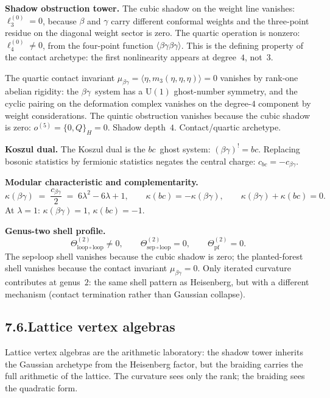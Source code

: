 \documentclass[11pt]{report}
\theoremstyle{definition}
\theoremstyle{remark}
\numberwithin{equation}{section}
\begin{document}
\medskip
\noindent\textbf{Shadow obstruction tower.}
The cubic shadow on the weight line vanishes: $\ell_3^{(0)}=0$,
because $\beta$ and $\gamma$ carry different conformal weights and the
three-point residue on the diagonal weight sector is zero. The
quartic operation is nonzero: $\ell_4^{(0)}\neq 0$, from the
four-point function
$\langle\beta\gamma\beta\gamma\rangle$. This is the defining
property of the contact archetype: the first nonlinearity appears at
degree~$4$, not~$3$.

The quartic contact invariant
$\mu_{\beta\gamma}=\langle\eta,m_3(\eta,\eta,\eta)\rangle=0$ vanishes
by rank-one abelian rigidity: the $\beta\gamma$~system has a
$\mathrm{U}(1)$ ghost-number symmetry, and the cyclic pairing
on the deformation complex vanishes on the degree-$4$ component by
weight considerations. The quintic obstruction vanishes because the
cubic shadow is zero: $o^{(5)}=\{0,Q\}_H=0$. Shadow depth~$4$.
Contact/quartic archetype.

\medskip
\noindent\textbf{Koszul dual.}
The Koszul dual is the $bc$~ghost system: $(\beta\gamma)^!=bc$.
Replacing bosonic statistics by fermionic statistics negates the
central charge: $c_{bc}=-c_{\beta\gamma}$.

\medskip
\noindent\textbf{Modular characteristic and complementarity.}
\[
\kappa(\beta\gamma)
\;=\;
\frac{c_{\beta\gamma}}{2}
\;=\;
6\lambda^2-6\lambda+1,
\qquad
\kappa(bc) = -\kappa(\beta\gamma),
\qquad
\kappa(\beta\gamma)+\kappa(bc)=0.
\]
At $\lambda=1$: $\kappa(\beta\gamma)=1$,
$\kappa(bc)=-1$.

\medskip
\noindent\textbf{Genus-two shell profile.}
\[
\Theta^{(2)}_{\mathrm{loop}\circ\mathrm{loop}}\neq 0,
\qquad
\Theta^{(2)}_{\mathrm{sep}\circ\mathrm{loop}}= 0,
\qquad
\Theta^{(2)}_{\mathrm{pf}}= 0.
\]
The sep$\circ$loop shell vanishes because the cubic shadow is zero;
the planted-forest shell vanishes because the contact invariant
$\mu_{\beta\gamma}=0$. Only iterated curvature contributes at
genus~$2$: the same shell pattern as Heisenberg, but with a different
mechanism (contact termination rather than Gaussian collapse).


\subsection*{7.6.\quad Lattice vertex algebras}

Lattice vertex algebras are the arithmetic laboratory: the shadow
tower inherits the Gaussian archetype from the Heisenberg factor, but
the braiding carries the full arithmetic of the lattice. The
curvature sees only the rank; the braiding sees the quadratic form.
\end{document}
